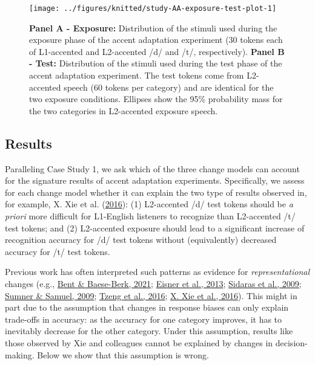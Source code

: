 \documentclass[
  11pt,
  man,floatsintext]{apa6}
\begin{document}
\begin{figure}

{\centering \texttt{[image: ../figures/knitted/study-AA-exposure-test-plot-1]} 

}

\caption{\textbf{Panel A - Exposure:} Distribution of the stimuli used during the exposure phase of the accent adaptation experiment (30 tokens each of L1-accented and L2-accented /d/ and /t/, respectively). \textbf{Panel B - Test:} Distribution of the stimuli used during the test phase of the accent adaptation experiment. The test tokens come from L2-accented speech (60 tokens per category) and are identical for the two exposure conditions. Ellipses show the 95\% probability mass for the two categories in L2-accented exposure speech.}\label{fig:study-AA-exposure-test-plot}
\end{figure}

\hypertarget{results-1}{%
\subsection{Results}\label{results-1}}

Paralleling Case Study 1, we ask which of the three change models can account for the signature results of accent adaptation experiments. Specifically, we assess for each change model whether it can explain the two type of results observed in, for example, X. Xie et al. (\protect\hyperlink{ref-xie2016jep}{2016}): (1) L2-accented /d/ test tokens should be \emph{a priori} more difficult for L1-English listeners to recognize than L2-accented /t/ test tokens; and (2) L2-accented exposure should lead to a significant increase of recognition accuracy for /d/ test tokens without (equivalently) decreased accuracy for /t/ test tokens.

Previous work has often interpreted such patterns as evidence for \emph{representational} changes (e.g., \protect\hyperlink{ref-bent-baeseberk2021}{Bent \& Baese-Berk, 2021}; \protect\hyperlink{ref-eisner2013}{Eisner et al., 2013}; \protect\hyperlink{ref-sidaras2009}{Sidaras et al., 2009}; \protect\hyperlink{ref-sumner2009}{Sumner \& Samuel, 2009}; \protect\hyperlink{ref-tzeng2016}{Tzeng et al., 2016}; \protect\hyperlink{ref-xie2016jep}{X. Xie et al., 2016}). This might in part due to the assumption that changes in response biases can only explain trade-offs in accuracy: as the accuracy for one category improves, it has to inevitably decrease for the other category. Under this assumption, results like those observed by Xie and colleagues cannot be explained by changes in decision-making. Below we show that this assumption is wrong.
\end{document}
